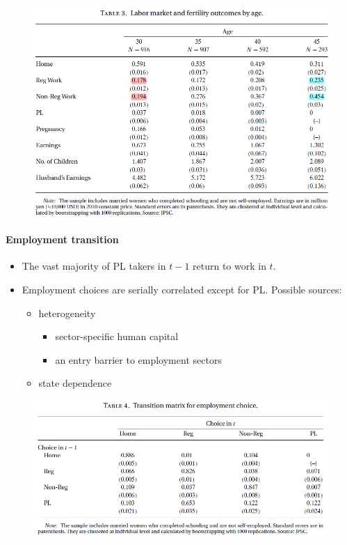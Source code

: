 \documentclass[../root]{subfiles}
\begin{document}
    \begin{figure}[h]
      \centering
      \includegraphics[scale = 1]{0619tanji/T3}
      \label{T2}
    \end{figure}

    \paragraph{Employment transition}

    \begin{itemize}
      \item The vast majority of PL takers in $t − 1$ return to work in $t$.
      \item Employment choices are serially correlated except for PL.
      Possible sources:
      \begin{itemize}
        \item heterogeneity
        \begin{itemize}
          \item sector-specific human capital
          \item an entry barrier to employment sectors
        \end{itemize}
        \item state dependence
      \end{itemize}
    \end{itemize}


    \begin{figure}[h]
      \centering
      \includegraphics[scale = 1]{0619tanji/T4}
      \label{T2}
    \end{figure}
\end{document}
